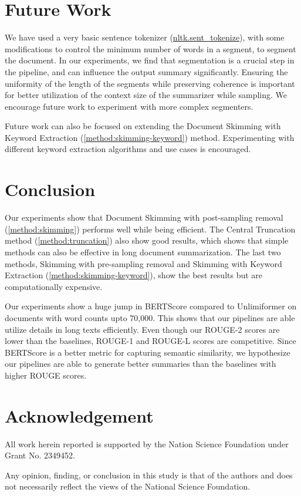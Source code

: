 \section{Future Work}
\label{sec:future-work}

We have used a very basic sentence tokenizer
(\href{https://www.nltk.org/api/nltk.tokenize.sent_tokenize.html}{nltk.sent\_tokenize}),
with some modifications to control the minimum number of words in a segment,
to segment the document.
In our experiments, we find that segmentation is a crucial step in the pipeline, and can
influence the output summary significantly.
Ensuring the uniformity of the length of the segments while preserving coherence is
important for better utilization of the context size of the summarizer while sampling.
We encourage future work to experiment with more complex segmenters.

Future work can also be focused on extending the Document Skimming with Keyword Extraction
(\ref{method:skimming-keyword}) method.
Experimenting with different keyword extraction algorithms and use cases is encouraged.


\section{Conclusion}
\label{sec:conclusion}

Our experiments show that Document Skimming with post-sampling removal (\ref{method:skimming})
performs well while being efficient.
The Central Truncation method (\ref{method:truncation}) also show good results, which shows
that simple methods can also be effective in long document summarization.
The last two methods, Skimming with pre-sampling removal and Skimming with Keyword Extraction
(\ref{method:skimming-keyword}), show the best results but are computationally expensive.

Our experiments show a huge jump in BERTScore compared to Unlimiformer on documents with word
counts upto 70,000.
This shows that our pipelines are able utilize details in long texts efficiently.
Even though our ROUGE-2 scores are lower than the baselines, ROUGE-1 and ROUGE-L
scores are competitive.
Since BERTScore is a better metric for capturing semantic similarity, we hypothesize
our pipelines are able to generate better summaries than the baselines with higher
ROUGE scores.


\section*{Acknowledgement}

All work herein reported is supported by the Nation Science Foundation under Grant No. 2349452.

Any opinion, finding, or conclusion in this study is that of the authors and does not necessarily reflect the views of the National Science Foundation.

